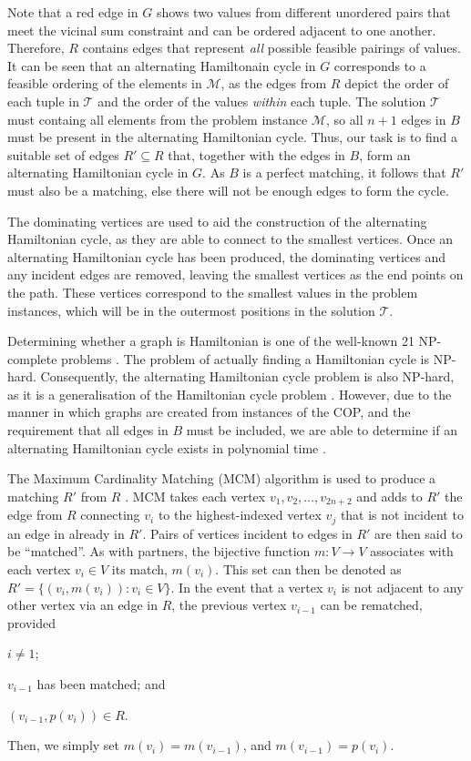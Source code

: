 \documentclass{elsarticle}
\begin{document}
\noindent Note that a red edge in $G$ shows two values from different unordered pairs that meet the vicinal sum constraint and can be ordered adjacent to one another. Therefore, $R$ contains edges that represent \emph{all} possible feasible pairings of values. It can be seen that an alternating Hamiltonain cycle in $G$ corresponds to a feasible ordering of the elements in $\mathcal{M}$, as the edges from $R$ depict the order of each tuple in $\mathcal{T}$ and the order of the values \emph{within} each tuple. The solution $\mathcal{T}$ must containg all elements from the problem instance $\mathcal{M}$, so all $n+1$ edges in $B$ must be present in the alternating Hamiltonian cycle. Thus, our task is to find a suitable set of edges $R' \subseteq R$ that, together with the edges in $B$, form an alternating Hamiltonian cycle in $G$. As $B$ is a perfect matching, it follows that $R'$ must also be a matching, else there will not be enough edges to form the cycle. 

The dominating vertices are used to aid the construction of the alternating Hamiltonian cycle, as they are able to connect to the smallest vertices. Once an alternating Hamiltonian cycle has been produced, the dominating vertices and any incident edges are removed, leaving the smallest vertices as the end points on the path. These vertices correspond to the smallest values in the problem instances, which will be in the outermost positions in the solution $\mathcal{T}$.

Determining whether a graph is Hamiltonian is one of the well-known 21 NP-complete problems \cite{karp1972}. The problem of actually finding a Hamiltonian cycle is NP-hard. Consequently, the alternating Hamiltonian cycle problem is also NP-hard, as it is a generalisation of the Hamiltonian cycle problem \cite{haggkvist1977}. However, due to the manner in which graphs are created from instances of the COP, and the requirement that all edges in $B$ must be included, we are able to determine if an alternating Hamiltonian cycle exists in polynomial time \cite{hawa2018}.

The Maximum Cardinality Matching (MCM) algorithm is used to produce a matching $R'$ from $R$ \cite{mahadev1994}. MCM takes each vertex $v_1, v_2,\dotsc,v_{2n+2}$ and adds to $R'$ the edge from $R$ connecting $v_i$ to the highest-indexed vertex $v_j$ that is not incident to an edge in already in $R'$. Pairs of vertices incident to edges in $R'$ are then said to be ``matched''. As with partners, the bijective function $m : V \to V$ associates with each vertex $v_i \in V$ its match, $m(v_i)$. This set can then be denoted as $R' = \{(v_i, m(v_i)): v_i \in V\}$. In the event that a vertex $v_i$ is not adjacent to any other vertex via an edge in $R$, the previous vertex $v_{i-1}$ can be rematched, provided 
\begin{enumerate*}[label={(\alph*)}]
	\item $i \neq 1$;
	\item $v_{i-1}$ has been matched; and
	\item $(v_{i-1}, p(v_i)) \in R$.
\end{enumerate*} 
Then, we simply set $m(v_i) = m(v_{i-1})$, and $m(v_{i-1}) = p(v_i)$.
\end{document}
